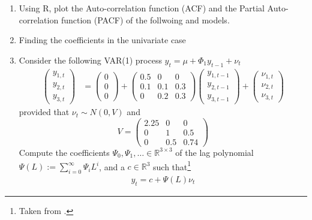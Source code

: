 \begin{enumerate}
    \item Using R, plot the Auto-correlation function (ACF) and the Partial Auto-correlation function (PACF) of the follwoing \ar{} and \ma{} models.

    \begin{sol}
        
    \end{sol}

    \item Finding the coefficients in the univariate case

    \begin{sol}

    \end{sol}

    \item Consider the following VAR(1) process $y_t = \mu + \Phi_1 y_{t-1} + \nu_t$
          \begin{align*}
              \begin{pmatrix} y_{1,t} \\ y_{2,t} \\ y_{3,t} \end{pmatrix}
               & = \begin{pmatrix} 0 \\ 0 \\ 0 \end{pmatrix}
              + \begin{pmatrix}
                    0.5 & 0   & 0   \\
                    0.1 & 0.1 & 0.3 \\
                    0   & 0.2 & 0.3
                \end{pmatrix}
              \begin{pmatrix}
                  y_{1, {t-1}} \\ y_{2, {t-1}} \\ y_{3, {t-1}}
              \end{pmatrix}
              + \begin{pmatrix}
                    \nu_{1,t} \\ \nu_{2,t} \\ \nu_{3,t}
                \end{pmatrix}
          \end{align*}
          provided that $\nu_t \sim N(0, V)$ and
          \[
              V
              = \begin{pmatrix}
                  2.25 & 0 & 0 \\ 0 & 1 & 0.5 \\ 0 & 0.5 & 0.74
              \end{pmatrix}
          \]
          Compute the coefficients $\Psi_0, \Psi_1, \dots \in \mathbb{R}^{3\times 3}$ of the lag polynomial $\Psi(L) := \sum_{i=0}^\infty \Psi_i L^i$, and a $c \in \mathbb{R}^3$ such that\footnote{Taken from \cite[][See section 16, "Understanding multivariate time series concepts"]{Mutschler-2018-github_repo}.}
          \begin{align*}
              y_t = c + \Psi(L) \nu_t
          \end{align*}


\end{enumerate}
